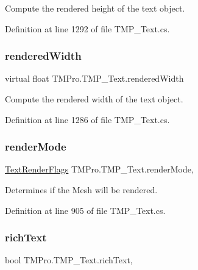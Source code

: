 Compute the rendered height of the text object. 



Definition at line 1292 of file T\+M\+P\+\_\+\+Text.\+cs.

\mbox{\label{class_t_m_pro_1_1_t_m_p___text_a101c97facd69481e2a0aed24b310b9c4}} 
\subsubsection{\texorpdfstring{renderedWidth}{renderedWidth}}
{\footnotesize\ttfamily virtual float T\+M\+Pro.\+T\+M\+P\+\_\+\+Text.\+rendered\+Width\hspace{0.3cm}{\ttfamily [get]}}



Compute the rendered width of the text object. 



Definition at line 1286 of file T\+M\+P\+\_\+\+Text.\+cs.

\mbox{\label{class_t_m_pro_1_1_t_m_p___text_a784fe87428c11962474464f4c1602b0e}} 
\subsubsection{\texorpdfstring{renderMode}{renderMode}}
{\footnotesize\ttfamily \mbox{\hyperlink{namespace_t_m_pro_ac5a571bdd8e4873a73f2c05b62feff0e}{Text\+Render\+Flags}} T\+M\+Pro.\+T\+M\+P\+\_\+\+Text.\+render\+Mode\hspace{0.3cm}{\ttfamily [get]}, {\ttfamily [set]}}



Determines if the Mesh will be rendered. 



Definition at line 905 of file T\+M\+P\+\_\+\+Text.\+cs.

\mbox{\label{class_t_m_pro_1_1_t_m_p___text_a3d9afda5078a7e48a52206736facf972}} 
\subsubsection{\texorpdfstring{richText}{richText}}
{\footnotesize\ttfamily bool T\+M\+Pro.\+T\+M\+P\+\_\+\+Text.\+rich\+Text\hspace{0.3cm}{\ttfamily [get]}, {\ttfamily [set]}}



